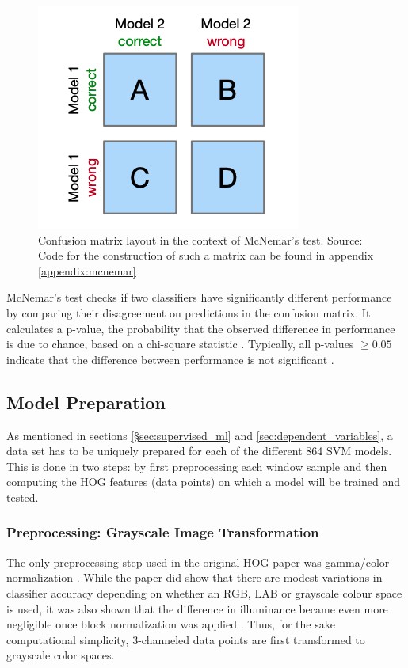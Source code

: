 \begin{figure}
    \centering
    \includegraphics[width=0.5\linewidth]{images/mcnemar_matrix.png}
    \caption{Confusion matrix layout in the context of McNemar's test. Source: \cite{raschka_2018_mcnemar} Code for the construction of such a matrix can be found in appendix \ref{appendix:mcnemar}}
    \label{fig:confusion_mcnemar}
\end{figure}

McNemar's test checks if two classifiers have significantly different performance by comparing their disagreement on predictions in the confusion matrix. It calculates a p-value, the probability that the observed difference in performance is due to chance, based on a chi-square statistic \cite{dietterich_1998_mcnemar}. Typically, all p-values $\ge 0.05$ indicate that the difference between performance is not significant \cite{raschka_2018_mcnemar} \cite{dietterich_1998_mcnemar}. 


\subsection{Model Preparation}

As mentioned in sections \ref{§sec:supervised_ml} and \ref{sec:dependent_variables}, a data set has to be uniquely prepared for each of the different 864 SVM models. This is done in two steps: by first preprocessing each window sample and then computing the HOG features (data points) on which a model will be trained and tested.

\subsubsection{Preprocessing: Grayscale Image Transformation}

The only preprocessing step used in the original HOG paper was gamma/color normalization \cite{dalal_2005_histograms}. While the paper did show that there are modest variations in classifier accuracy depending on whether an RGB, LAB or grayscale colour space is used, it was also shown that the difference in illuminance became even more negligible once block normalization was applied \cite{dalal_2005_histograms}. Thus, for the sake computational simplicity, 3-channeled data points are first transformed to grayscale color spaces.

